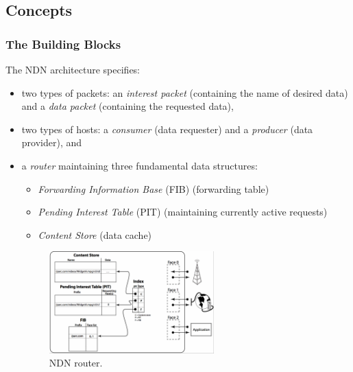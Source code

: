         \subsection{Concepts}

            \subsubsection{The Building Blocks}

                The NDN architecture specifies:
                    \begin{itemize}
                        \item two types of packets: an \emph{interest packet} (containing the name of desired data) and a \emph{data packet} (containing the requested data),
                        \item two types of hosts: a \emph{consumer} (data requester) and a \emph{producer} (data provider), and
                        \item a \emph{router} maintaining three fundamental data structures:
                        \begin{itemize}
                            \item \emph{Forwarding Information Base} (FIB) (forwarding table)
                            \item \emph{Pending Interest Table} (PIT) (maintaining currently active requests)
                            \item \emph{Content Store} (data cache)
                        \end{itemize}
                        \begin{figure}[H]
                            \begin{center}
                                \includegraphics[width=0.6\textwidth]{fig/archs_ndn-router.png}
                              \caption{NDN router.}
                              \label{fig:ndn-router}
                            \end{center}
                        \end{figure}

                    \end{itemize}

